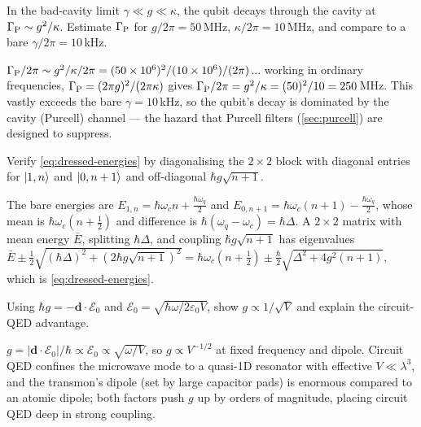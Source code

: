 \begin{exercise}
In the bad-cavity limit $\gamma\ll g\ll\kappa$, the qubit decays
through the cavity at $\Gamma_{\rm P}\sim g^2/\kappa$. Estimate
$\Gamma_{\rm P}$ for $g/2\pi=50\,$MHz, $\kappa/2\pi=10\,$MHz, and
compare to a bare $\gamma/2\pi=10\,$kHz.
\begin{solution}
$\Gamma_{\rm P}/2\pi\sim g^2/\kappa/2\pi=(50\times10^6)^2/(10\times10^6)/(2\pi)$...
working in ordinary frequencies, $\Gamma_{\rm P}=(2\pi g)^2/(2\pi\kappa)$
gives $\Gamma_{\rm P}/2\pi=g^2/\kappa=(50)^2/10=250\,$MHz. This vastly
exceeds the bare $\gamma=10\,$kHz, so the qubit's decay is dominated
by the cavity (Purcell) channel --- the hazard that Purcell filters
(\cref{sec:purcell}) are designed to suppress.
\end{solution}
\end{exercise}

\begin{exercise}
Verify \cref{eq:dressed-energies} by diagonalising the
$2\times2$ block with diagonal entries for $\ket{1,n}$ and
$\ket{0,n+1}$ and off-diagonal $\hbar g\sqrt{n+1}$.
\begin{solution}
The bare energies are $E_{1,n}=\hbar\omega_c n+\tfrac{\hbar\omega_q}2$
and $E_{0,n+1}=\hbar\omega_c(n+1)-\tfrac{\hbar\omega_q}2$, whose
mean is $\hbar\omega_c(n+\tfrac12)$ and difference is
$\hbar(\omega_q-\omega_c)=\hbar\Delta$. A $2\times2$ matrix with
mean energy $\bar E$, splitting $\hbar\Delta$, and coupling
$\hbar g\sqrt{n+1}$ has eigenvalues
$\bar E\pm\tfrac12\sqrt{(\hbar\Delta)^2+(2\hbar g\sqrt{n+1})^2}
=\hbar\omega_c(n+\tfrac12)\pm\tfrac\hbar2\sqrt{\Delta^2+4g^2(n+1)}$,
which is \cref{eq:dressed-energies}.
\end{solution}
\end{exercise}

\begin{exercise}
Using $\hbar g=-\bm d\cdot\bm{\mathcal E}_0$ and
$\mathcal E_0=\sqrt{\hbar\omega/2\varepsilon_0 V}$, show
$g\propto1/\sqrt V$ and explain the circuit-QED advantage.
\begin{solution}
$g=|\bm d\cdot\bm{\mathcal E}_0|/\hbar\propto\mathcal E_0\propto\sqrt{\omega/V}$,
so $g\propto V^{-1/2}$ at fixed frequency and dipole. Circuit QED
confines the microwave mode to a quasi-1D resonator with effective
$V\ll\lambda^3$, and the transmon's dipole (set by large capacitor
pads) is enormous compared to an atomic dipole; both factors push
$g$ up by orders of magnitude, placing circuit QED deep in strong
coupling.
\end{solution}
\end{exercise}
